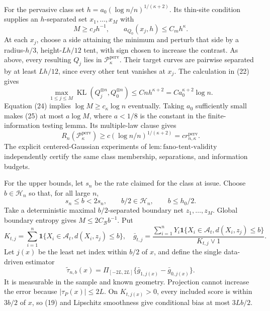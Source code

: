 For the pervasive class set
\(h=a_0(\log n/n)^{1/(\kappa+2)}\).  Its thin-site condition supplies an
\(h\)-separated set \(x_1,\ldots,x_M\) with
\[
 M\ge c_Jh^{-1},
 \qquad a_{Q_0}(x_j,h)\le C_mh^{\kappa}.
 \tag{24}
\]
At each \(x_j\), choose a side attaining the minimum and perturb that side
by a radius-\(h/3\), height-\(Lh/12\) tent, with sign chosen to increase
the contrast.  As above, every resulting \(Q_j\) lies in
\(\mathcal P_{\kappa}^{\mathrm{perv}}\).  Their target curves are pairwise
separated by at least \(Lh/12\), since every other tent vanishes at
\(x_j\).  The calculation in (22) gives
\[
 \max_{1\le j\le M}\operatorname{KL}(Q_j^{\otimes n},Q_0^{\otimes n})
 \le Cnh^{\kappa+2}=Ca_0^{\kappa+2}\log n.
 \tag{25}
\]
Equation (24) implies \(\log M\ge c_{\kappa}\log n\) eventually.  Taking
\(a_0\) sufficiently small makes (25) at most \(a\log M\), where
\(a<1/8\) is the constant in the finite-information testing lemma.  Its
multiple-law clause gives
\[
 R_n(\mathcal P_{\kappa}^{\mathrm{perv}})
 \ge c(\log n/n)^{1/(\kappa+2)}
 =c r_{n,\kappa}^{\mathrm{perv}}.
 \tag{26}
\]
The explicit centered-Gaussian experiments of
\(\mathrm{lem:fano\text{-}tent\text{-}validity}\) independently certify
the same class membership, separations, and information budgets.

For the upper bounds, let \(s_n\) be the rate claimed for the class at
issue.  Choose \(b\in\mathcal H_n\) so that, for all large \(n\),
\[
 s_n\le b<2s_n,
 \qquad b/2\in\mathcal H_n,
 \qquad b\le h_0/2.
 \tag{27}
\]
Take a deterministic maximal \(b/2\)-separated boundary net
\(z_1,\ldots,z_M\).  Global boundary entropy gives
\(M\le2C_{\mathcal B}b^{-1}\).  Put
\[
 K_{t,j}=\sum_{i=1}^n\mathbf1\{X_i\in\mathcal A_t,
                    d(X_i,z_j)\le b\},
 \quad
 \bar g_{t,j}=\frac{\sum_{i=1}^nY_i\mathbf1\{X_i\in\mathcal A_t,
                    d(X_i,z_j)\le b\}}{K_{t,j}\vee1}.
\]
Let \(j(x)\) be the least net index within \(b/2\) of \(x\), and define
the single data-driven estimator
\[
 \widetilde\tau_{n,b}(x)=
 \Pi_{[-2L,2L]}\{\bar g_{1,j(x)}-\bar g_{0,j(x)}\}.
 \tag{28}
\]
It is measurable in the sample and known geometry.  Projection cannot
increase the error because \(|\tau_P(x)|\le2L\).  On
\(K_{t,j(x)}>0\), every included score is within \(3b/2\) of \(x\), so
(19) and Lipschitz smoothness give conditional bias at most \(3Lb/2\).

